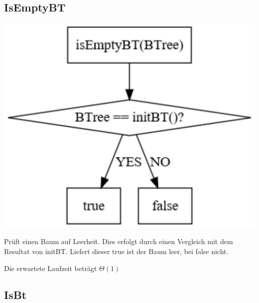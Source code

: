 \documentclass[11pt]{article}
\begin{document}
    \subsection{IsEmptyBT}\label{subsec:isemptybt}
    
    \begin{center}
        \includegraphics[width=1\columnwidth] {isempty.pdf}
    \end{center}
    
    Prüft einen Baum auf Leerheit.
    Dies erfolgt durch einen Vergleich mit dem Resultat von
    initBT. Liefert dieser true ist der Baum leer, bei false
    nicht.

    Die erwartete Laufzeit beträgt
    \begin{math}
        \Theta(1)
    \end{math}

    \subsection{IsBt}\label{subsec:isbt}
\end{document}
